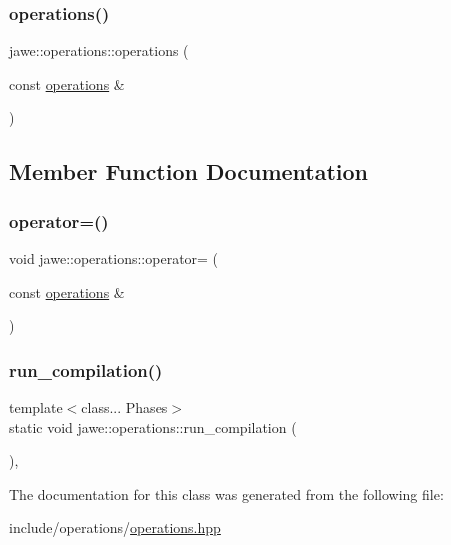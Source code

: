 \mbox{\label{classjawe_1_1operations_ad2bc3be4977c615d41438943de301df2}} 
\subsubsection{\texorpdfstring{operations()}{operations()}\hspace{0.1cm}{\footnotesize\ttfamily [2/2]}}
{\footnotesize\ttfamily jawe\+::operations\+::operations (\begin{DoxyParamCaption}\item[{const \hyperlink{classjawe_1_1operations}{operations} \&}]{ }\end{DoxyParamCaption})\hspace{0.3cm}{\ttfamily [delete]}}



\subsection{Member Function Documentation}
\mbox{\label{classjawe_1_1operations_a3a3e733871595cc3a5af0aa1fa9ab381}} 
\subsubsection{\texorpdfstring{operator=()}{operator=()}}
{\footnotesize\ttfamily void jawe\+::operations\+::operator= (\begin{DoxyParamCaption}\item[{const \hyperlink{classjawe_1_1operations}{operations} \&}]{ }\end{DoxyParamCaption})\hspace{0.3cm}{\ttfamily [delete]}}

\mbox{\label{classjawe_1_1operations_a078652a07a6ad9d6282f3b8aeab82049}} 
\subsubsection{\texorpdfstring{run\+\_\+compilation()}{run\_compilation()}}
{\footnotesize\ttfamily template$<$class... Phases$>$ \\
static void jawe\+::operations\+::run\+\_\+compilation (\begin{DoxyParamCaption}{ }\end{DoxyParamCaption})\hspace{0.3cm}{\ttfamily [inline]}, {\ttfamily [static]}}



The documentation for this class was generated from the following file\+:\begin{DoxyCompactItemize}
\item 
include/operations/\hyperlink{operations_8hpp}{operations.\+hpp}\end{DoxyCompactItemize}
